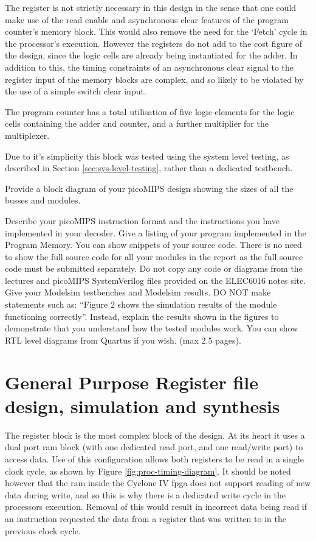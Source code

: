 The register is not strictly necessary in this design in the sense that one could make use of the read enable and asynchronous clear features of the program counter's memory block. This would also remove the need for the `Fetch' cycle in the processor's execution. However the registers do not add to the cost figure of the design, since the logic cells are already being instantiated for the adder. In addition to this, the timing constraints of an asynchronous clear signal to the register input of the memory blocks are complex, and so likely to be violated by the use of a simple switch clear input.

The program counter has a total utilisation of five logic elements for the logic cells containing the adder and counter, and a further multiplier for the multiplexer.

Due to it's simplicity this block was tested using the system level testing, as described in Section \ref{sec:sys-level-testing}, rather than a dedicated testbench.


\review
{
	Provide a block diagram of your picoMIPS design showing the sizes of all the busses and modules.
	
	Describe your picoMIPS instruction format and the instructions you have implemented in your decoder.
	Give a listing of your program implemented in the Program Memory. You can show snippets of your source code.
	There is no need to show the full source code for all your modules in the report as the full source code must be submitted separately.
	Do not copy any code or diagrams from the lectures and picoMIPS SystemVerilog files provided on the ELEC6016 notes site.
	Give your Modelsim testbenches and Modelsim results.
	DO NOT make statements such as: “Figure 2 shows the simulation results of the module functioning correctly”.
	Instead, explain the results shown in the figures to demonstrate that you understand how the tested modules work.
	You can show RTL level diagrams from Quartus if you wish. (max 2.5 pages).
}


\section{General Purpose Register file design, simulation and synthesis}

The register block is the most complex block of the design. At its heart it uses a dual port \gls{ram} block (with one dedicated read port, and one read/write port) to access data. Use of this configuration allows both registers to be read in a single clock cycle, as shown by Figure \ref{fig:proc-timing-diagram}. It should be noted however that the \gls{ram} inside the Cyclone IV \gls{fpga} does not support reading of new data during write, and so this is why there is a dedicated write cycle in the processors execution. Removal of this would result in incorrect data being read if an instruction requested the data from a register that was written to in the previous clock cycle.

